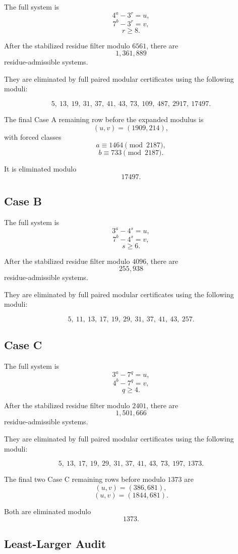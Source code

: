 \documentclass[11pt]{article}
\begin{document}
The full system is
\[
4^a-3^r=u,
\]
\[
7^b-3^r=v,
\]
\[
r\ge8.
\]

After the stabilized residue filter modulo \(6561\), there are
\[
1{,}361{,}889
\]
residue-admissible systems.

They are eliminated by full paired modular certificates using the following moduli:

\[
5,\ 13,\ 19,\ 31,\ 37,\ 41,\ 43,\ 73,\ 109,\ 487,\ 2917,\ 17497.
\]

The final Case A remaining row before the expanded modulus is
\[
(u,v)=(1909,214),
\]
with forced classes
\[
a\equiv1464\pmod{2187},
\]
\[
b\equiv733\pmod{2187}.
\]

It is eliminated modulo
\[
17497.
\]

\subsection*{Case B}

The full system is
\[
3^a-4^s=u,
\]
\[
7^b-4^s=v,
\]
\[
s\ge6.
\]

After the stabilized residue filter modulo \(4096\), there are
\[
255{,}938
\]
residue-admissible systems.

They are eliminated by full paired modular certificates using the following moduli:

\[
5,\ 11,\ 13,\ 17,\ 19,\ 29,\ 31,\ 37,\ 41,\ 43,\ 257.
\]

\subsection*{Case C}

The full system is
\[
3^a-7^q=u,
\]
\[
4^b-7^q=v,
\]
\[
q\ge4.
\]

After the stabilized residue filter modulo \(2401\), there are
\[
1{,}501{,}666
\]
residue-admissible systems.

They are eliminated by full paired modular certificates using the following moduli:

\[
5,\ 13,\ 17,\ 19,\ 29,\ 31,\ 37,\ 41,\ 43,\ 73,\ 197,\ 1373.
\]

The final two Case C remaining rows before modulo \(1373\) are
\[
(u,v)=(386,681),
\]
\[
(u,v)=(1844,681).
\]

Both are eliminated modulo
\[
1373.
\]

\subsection*{Least-Larger Audit}
\end{document}

